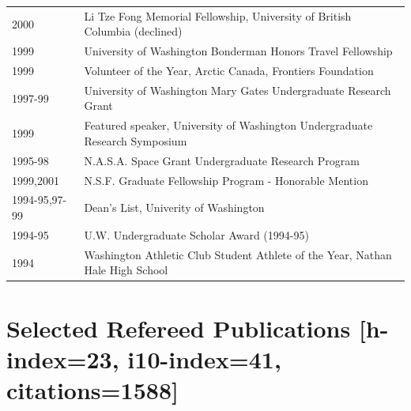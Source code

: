 \documentclass[11pt]{article}
\begin{document}
\begin{tabular}{ll}
2000 & Li Tze Fong Memorial Fellowship, University of British Columbia (declined) \\
1999 & University of Washington Bonderman Honors Travel Fellowship \\
1999 & Volunteer of the Year, Arctic Canada, Frontiers Foundation \\
1997-99 & University of Washington Mary Gates Undergraduate Research Grant \\
1999 & Featured speaker, University of Washington Undergraduate Research Symposium \\
1995-98 & N.A.S.A. Space Grant Undergraduate Research Program \\
1999,2001 & N.S.F. Graduate Fellowship Program - Honorable Mention \\
1994-95,97-99 & Dean's List, Univerity of Washington \\
1994-95 & U.W. Undergraduate Scholar Award (1994-95) \\
1994 & Washington Athletic Club Student Athlete of the Year, Nathan Hale High School \\
\end{tabular}

\pagebreak

\section*{Selected Refereed Publications \small{[h-index=23, i10-index=41, citations=1588]}}
\setlength{\extrarowheight}{10pt}
\end{document}
